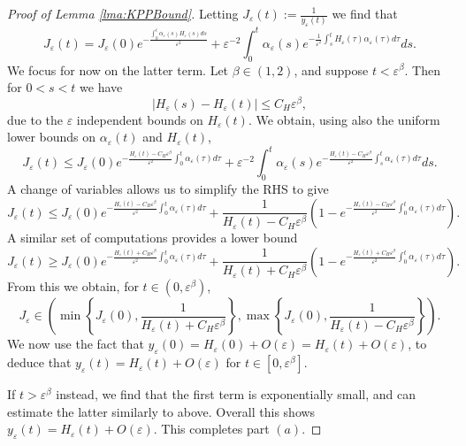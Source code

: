 \documentclass[]{article}
\theoremstyle{remark}
\begin{document}
\begin{proof}[Proof of Lemma \ref{lma:KPPBound}]
Letting $J_\varepsilon(t):=\frac{1}{y_\varepsilon(t)}$ we find that 
\[J_\varepsilon(t)=J_\varepsilon(0)e^{-\frac{\int_{0}^{t}\alpha_\varepsilon(s)H_\varepsilon(s)ds}{\varepsilon^2}}+\varepsilon^{-2}\int_{0}^{t}\alpha_{\varepsilon}(s)e^{-\frac{1}{\varepsilon^2}\int_{s}^{t}H_\varepsilon(\tau)\alpha_\varepsilon(\tau)d\tau}ds.\]
We focus for now on the latter term. Let $\beta\in(1,2)$, and suppose $t<\varepsilon^\beta$. Then for $0<s<t$ we have
\[|H_\varepsilon(s)-H_\varepsilon(t)|\leq{}C_H{}\varepsilon^\beta,\]
 due to the $\varepsilon$ independent bounds on $H_\varepsilon(t)$. We obtain, using also the uniform lower bounds on $\alpha_\varepsilon(t)$ and $H_\varepsilon(t)$,
\[J_\varepsilon(t)\leq{}J_\varepsilon
(0)e^{-\frac{H_\varepsilon(t)-C_H\varepsilon^\beta}{\varepsilon^2}\int_{0}^{t}\alpha_\varepsilon(\tau)d\tau}+\varepsilon^{-2}\int_{0}^{t}\alpha_\varepsilon(s)e^{-\frac{H_\varepsilon(t)-C_H\varepsilon^\beta}{\varepsilon^2}\int_{s}^{t}\alpha_\varepsilon(\tau)d\tau}ds.\]
A change of variables allows us to simplify the RHS to give 
\[J_\varepsilon(t)\leq{}J_\varepsilon
(0)e^{-\frac{H_\varepsilon(t)-C_H\varepsilon^\beta}{\varepsilon^2}\int_{0}^{t}\alpha_\varepsilon(\tau)d\tau}+\frac{1}{H_\varepsilon(t)-C_H\varepsilon^\beta}\left(1-e^{-\frac{H_\varepsilon(t)-C_H\varepsilon^\beta}{\varepsilon^2}\int_{0}^{t}\alpha_\varepsilon(\tau)d\tau}\right).\]
A similar set of computations provides a lower bound
\[J_\varepsilon(t)\geq{}J_\varepsilon
(0)e^{-\frac{H_\varepsilon(t)+C_H\varepsilon^\beta}{\varepsilon^2}\int_{0}^{t}\alpha_\varepsilon(\tau)d\tau}+\frac{1}{H_\varepsilon(t)+C_H\varepsilon^\beta}\left(1-e^{-\frac{H_\varepsilon(t)+C_H\varepsilon^\beta}{\varepsilon^2}\int_{0}^{t}\alpha_\varepsilon(\tau)d\tau}\right).\]
From this we obtain, for $t\in(0,\varepsilon^\beta)$, \[J_\varepsilon\in\left(\min\left\{J_\varepsilon(0),\frac{1}{H_\varepsilon(t)+C_H\varepsilon^\beta}\right\},\max\left\{J_\varepsilon(0),\frac{1}{H_\varepsilon(t)-C_H\varepsilon^\beta}\right\}\right).\]
We now use the fact that $y_\varepsilon(0)=H_\varepsilon(0)+O(\varepsilon)=H_\varepsilon(t)+O(\varepsilon)$, to deduce that $y_\varepsilon(t)=H_\varepsilon(t)+O(\varepsilon)$ for $t\in[0,\varepsilon^\beta].$


If $t>\varepsilon^\beta$ instead, we find that the first term is exponentially small, and can estimate the latter similarly to above. Overall this shows $y_\varepsilon(t)=H_\varepsilon(t)+O(\varepsilon)$. This completes part $(a)$. 


\end{proof}
\end{document}

